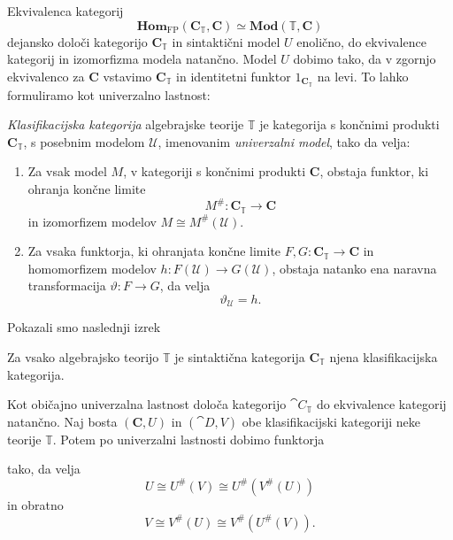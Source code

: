 \documentclass[../kategoricna_logika.tex]{subfiles}
\begin{document}
Ekvivalenca kategorij
\[ \mathbf{Hom}_{\mathrm{FP}}(\mathbf{C}_{\mathbb{T}}, \mathbf{C}) \simeq \mathbf{Mod}(\mathbb{T}, \mathbf{C}) \]
dejansko določi kategorijo $\mathbf{C}_{\mathbb{T}}$ in sintaktični model $U$ enolično,
do ekvivalence kategorij in izomorfizma modela natančno.
Model $U$ dobimo tako, da v zgornjo ekvivalenco za $\mathbf{C}$ vstavimo $\mathbf{C}_{\mathbb{T}}$
in identitetni funktor $1_{\mathbf{C}_{\mathbb{T}}}$ na levi. To lahko formuliramo kot univerzalno lastnost:
\begin{definicija}
  \emph{Klasifikacijska kategorija} algebrajske teorije $\mathbb{T}$
  je kategorija s končnimi produkti $\mathbf{C}_\mathbb{T}$, s
  posebnim modelom $\mathcal{U}$, imenovanim \emph{univerzalni model},
  tako da velja:
  \begin{enumerate}
  \item Za vsak model $M$, v kategoriji s končnimi produkti
    $\mathbf{C}$, obstaja funktor, ki ohranja končne limite
    $$M^{\#} : \mathbf{C}_\mathbb{T} \to \mathbf{C}$$ in izomorfizem
    modelov $M \cong M^{\#}(\mathcal{U})$.
%
  \item Za vsaka funktorja, ki ohranjata končne limite
    $F,G : \mathbf{C}_\mathbb{T} \to \mathbf{C}$ in homomorfizem
    modelov $h: F(\mathcal{U}) \to G(\mathcal{U})$, obstaja natanko
    ena naravna transformacija $\vartheta : F \to G$, da velja
$$\vartheta_\mathcal{U} = h.$$
\end{enumerate}
\end{definicija}
Pokazali smo naslednji izrek
\begin{izrek}
\label{sec:klasifikacijska-kategorija-alg-teorije}
Za vsako algebrajsko teorijo $\mathbb{T}$ je sintaktična kategorija $\mathbf{C}_{\mathbb{T}}$
njena klasifikacijska kategorija.
\end{izrek}
Kot običajno univerzalna lastnost določa kategorijo $\cat{C}_{\mathbb{T}}$ do ekvivalence kategorij natančno.
%
Naj bosta $(\mathbf{C}, U)$ in $(\cat{D}, V)$ obe klasifikacijski
kategoriji neke teorije $\mathbb{T}$. Potem po univerzalni lastnosti
dobimo funktorja
\begin{center}
\end{center}
tako, da velja
$$U \cong U^{\#}(V) \cong U^{\#}(V^{\#}(U))$$
in obratno
\[ V \cong V^{\#}(U) \cong V^{\#}(U^{\#}(V)).\]
\end{document}
